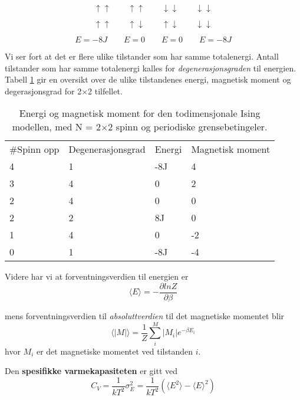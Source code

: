 \documentclass[11pt,a4paper]{article}
\begin{document}
\[ \uparrow \uparrow \quad \quad \uparrow \uparrow \quad \quad \downarrow \downarrow \quad \quad \downarrow \downarrow \]

\[ \uparrow \uparrow \quad \quad \uparrow \downarrow \quad \quad \uparrow \downarrow \quad \quad \downarrow \downarrow \]

\[ E = -8J \quad \quad E = 0 \quad \quad E = 0 \quad \quad E = -8J \]

Vi ser fort at det er flere ulike tilstander som har samme totalenergi. Antall tilstander som har samme totalenergi kalles for \textit{degenerasjonsgraden} til energien. Tabell \ref{degen}  gir en oversikt over de ulike tilstandenes energi, magnetisk moment og degerasjonsgrad for 2$\times$2 tilfellet.

\FloatBarrier
\begin{table}[!ht]
\centering
\caption{Energi og magnetisk moment for den todimensjonale Ising modellen, med N = 2$\times$2 spinn og periodiske grensebetingeler.}
\label{degen}
\begin{tabular}{llll}
\#Spinn opp & Degenerasjonsgrad & Energi & Magnetisk moment \\
4           & 1                 & -8J    & 4             \\
3           & 4                 & 0      & 2             \\
2           & 4                 & 0      & 0             \\
2           & 2                 & 8J     & 0             \\
1           & 4                 & 0      & -2            \\
0           & 1                 & -8J    & -4           
\end{tabular}
\end{table}
\FloatBarrier

Videre har vi at forventningsverdien til energien er 
\begin{equation}
\langle E \rangle = - \frac{\partial lnZ}{\partial \beta} 
\end{equation}

mens forventningsverdien til \textit{absoluttverdien} til det magnetiske momentet blir
\begin{equation}
\langle |M| \rangle = \frac{1}{Z} \sum_i^M |M_i| e^{-\beta E_i}
\end{equation}
hvor $M_i$ er det magnetiske momentet ved tilstanden $i$.


Den \textbf{spesifikke varmekapasiteten} er gitt ved
\begin{equation}
C_V = \frac{1}{kT^2}\sigma_E^2 = \frac{1}{kT^2}(\langle E^2 \rangle - \langle E \rangle^2 )
\end{equation}
\end{document}
